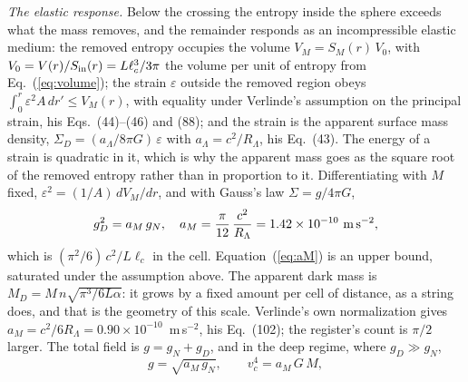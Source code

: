 \documentclass[aps,prd,twocolumn,superscriptaddress,nofootinbib,showkeys]{revtex4-2}
\newcommand{\lc}{\ell_c}
\newcommand{\RL}{R_\Lambda}
\begin{document}
\textit{The elastic response.} Below the crossing the entropy inside the sphere exceeds what the mass removes, and the remainder responds as an incompressible elastic medium: the removed entropy occupies the volume $V_M = S_M(r)\,V_0$, with $V_0 = V(r)/S_{\rm in}(r) = L\lc^3/3\pi$ the volume per unit of entropy from Eq.~(\ref{eq:volume}); the strain $\varepsilon$ outside the removed region obeys $\int_0^r \varepsilon^2 A\,dr' \le V_M(r)$, with equality under Verlinde's assumption on the principal strain, his Eqs.~(44)--(46) and (88); and the strain is the apparent surface mass density, $\Sigma_D = (a_\Lambda/8\pi G)\,\varepsilon$ with $a_\Lambda = c^2/\RL$, his Eq.~(43). The energy of a strain is quadratic in it, which is why the apparent mass goes as the square root of the removed entropy rather than in proportion to it. Differentiating with $M$ fixed, $\varepsilon^2 = (1/A)\,dV_M/dr$, and with Gauss's law $\Sigma = g/4\pi G$,
\begin{equation}
g_D^2 = a_M\,g_N, \quad a_M = \frac{\pi}{12}\,\frac{c^2}{\RL} = 1.42\times10^{-10}~{\rm m\,s^{-2}} ,
\label{eq:aM}
\end{equation}
which is $(\pi^2/6)\,c^2/L\lc$ in the cell. Equation~(\ref{eq:aM}) is an upper bound, saturated under the assumption above. The apparent dark mass is $M_D = M\,n\sqrt{\pi^3/6L\alpha}$: it grows by a fixed amount per cell of distance, as a string does, and that is the geometry of this scale. Verlinde's own normalization gives $a_M = c^2/6\RL = 0.90\times10^{-10}$~m\,s$^{-2}$, his Eq.~(102); the register's count is $\pi/2$ larger. The total field is $g = g_N + g_D$, and in the deep regime, where $g_D\gg g_N$,
\begin{equation}
g = \sqrt{a_M\,g_N},\qquad v_c^4 = a_M\,G\,M ,
\label{eq:btfr}
\end{equation}
\end{document}
